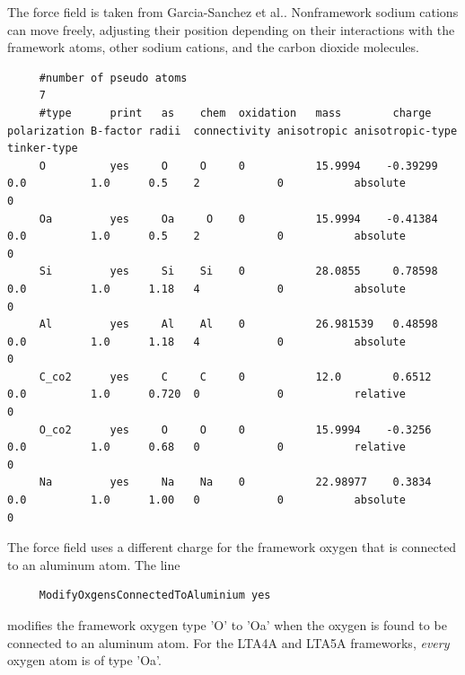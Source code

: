 \noindent
The force field is taken from Garcia-Sanchez et al.\cite{GarciaSanchez2009}.
Nonframework sodium cations can move freely, adjusting their position depending on their interactions with the framework atoms, 
other sodium cations, and the carbon dioxide molecules.
\begin{tiny}
\begin{verbatim}
     #number of pseudo atoms
     7
     #type      print   as    chem  oxidation   mass        charge   polarization B-factor radii  connectivity anisotropic anisotropic-type   tinker-type
     O          yes     O     O     0           15.9994    -0.39299  0.0          1.0      0.5    2            0           absolute           0
     Oa         yes     Oa     O    0           15.9994    -0.41384  0.0          1.0      0.5    2            0           absolute           0
     Si         yes     Si    Si    0           28.0855     0.78598  0.0          1.0      1.18   4            0           absolute           0
     Al         yes     Al    Al    0           26.981539   0.48598  0.0          1.0      1.18   4            0           absolute           0
     C_co2      yes     C     C     0           12.0        0.6512   0.0          1.0      0.720  0            0           relative           0
     O_co2      yes     O     O     0           15.9994    -0.3256   0.0          1.0      0.68   0            0           relative           0
     Na         yes     Na    Na    0           22.98977    0.3834   0.0          1.0      1.00   0            0           absolute           0
\end{verbatim}
\end{tiny}
The force field uses a different charge for the framework oxygen that is connected to an aluminum atom.
The line
\begin{tiny}
\begin{verbatim}
     ModifyOxgensConnectedToAluminium yes
\end{verbatim}
\end{tiny}
modifies the framework oxygen type 'O' to 'Oa' when the oxygen is found to be connected to an aluminum atom.
For the LTA4A and LTA5A frameworks, \emph{every} oxygen atom is of type 'Oa'.

